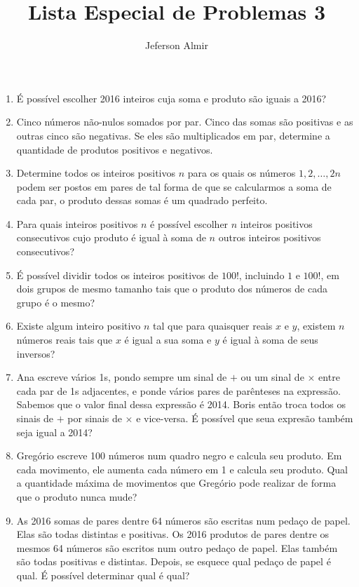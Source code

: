 \documentclass{article}
\title{Lista Especial de Problemas 3}
\author{Jeferson Almir}
\date{}
\begin{document}
\maketitle

\begin{enumerate}
    \item É possível escolher 2016 inteiros
    cuja soma e produto são iguais a 2016?
    
    \item Cinco números não-nulos somados por par.
    Cinco das somas são positivas
    e as outras cinco são negativas.
    Se eles são multiplicados em par,
    determine a quantidade de produtos positivos e negativos.
    
    \item Determine todos os inteiros positivos $n$
    para os quais os números $1,2,\dots,2n$
    podem ser postos em pares
    de tal forma de que se calcularmos a soma de cada par,
    o produto dessas somas é um quadrado perfeito.
    
    \item Para quais inteiros positivos $n$
    é possível escolher $n$ inteiros positivos consecutivos
    cujo produto é igual à soma de $n$ outros inteiros positivos consecutivos?
    
    \item É possível dividir todos os inteiros positivos de $100!$,
    incluindo $1$ e $100!$,
    em dois grupos de mesmo tamanho
    tais que o produto dos números de cada grupo é o mesmo?
    
    \item Existe algum inteiro positivo $n$
    tal que para quaisquer reais $x$ e $y$,
    existem $n$ números reais
    tais que $x$ é igual a sua soma
    e $y$ é igual à soma de seus inversos?
    
    \item Ana escreve vários 1s,
    pondo sempre um sinal de $+$
    ou um sinal de $\times$
    entre cada par de 1s adjacentes,
    e ponde vários pares de parênteses na expressão.
    Sabemos que o valor final dessa expressão é 2014.
    Boris então troca todos os sinais de $+$ por sinais de $\times$ e vice-versa.
    É possível que seua expresão também seja igual a 2014?
    
    \item Gregório escreve 100 números num quadro negro
    e calcula seu produto.
    Em cada movimento,
    ele aumenta cada número em 1
    e calcula seu produto.
    Qual a quantidade máxima de movimentos
    que Gregório pode realizar
    de forma que o produto nunca mude?
    
    \item As 2016 somas de pares dentre 64 números
    são escritas num pedaço de papel.
    Elas são todas distintas e positivas.
    Os 2016 produtos de pares dentre os mesmos 64 números
    são escritos num outro pedaço de papel.
    Elas também são todas positivas e distintas.
    Depois, se esquece qual pedaço de papel é qual.
    É possível determinar qual é qual?
\end{enumerate}
\end{document}
